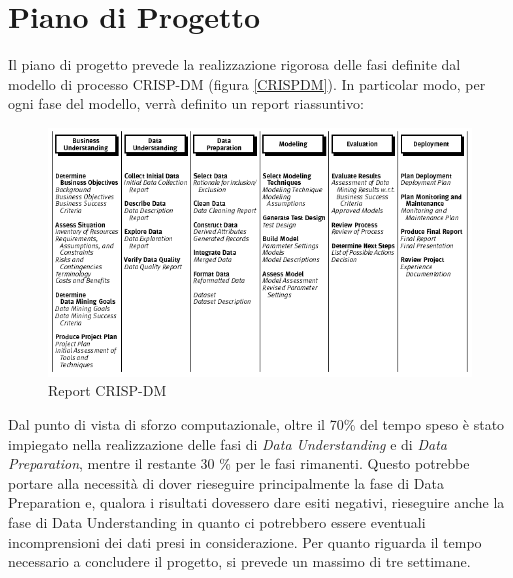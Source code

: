 \section{Piano di Progetto}
Il piano di progetto prevede la realizzazione rigorosa delle fasi definite dal modello di processo CRISP-DM (figura \ref{CRISPDM}).
In particolar modo, per ogni fase del modello, verrà definito un report riassuntivo: 
\begin{figure}[hbtp]
	\centering
	\includegraphics[width=1\textwidth]{./images/Metodologia_CRISP_DM.png}
	\caption{Report CRISP-DM}
	\label{Report_CRISPDM}
\end{figure}
Dal punto di vista di sforzo computazionale, oltre il 70\% del tempo speso è stato impiegato nella realizzazione delle fasi di \textit{Data Understanding} e di \textit{Data Preparation}, mentre il restante 30 \% per le fasi rimanenti.
Questo potrebbe portare alla necessità di dover rieseguire principalmente la fase di Data Preparation e, qualora i risultati dovessero dare esiti negativi, rieseguire anche la fase di Data Understanding in quanto ci potrebbero essere eventuali incomprensioni dei dati presi in considerazione.
Per quanto riguarda il tempo necessario a concludere il progetto, si prevede un massimo di tre settimane.